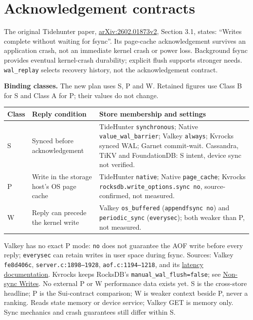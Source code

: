 \section{Acknowledgement contracts}\label{sec:ack}
\begingroup\small
The original Tidehunter paper, \href{https://arxiv.org/abs/2602.01873v2}{arXiv:2602.01873v2},
Section 3.1, states: ``Writes complete without waiting for fsync''.
Its page-cache acknowledgement survives an application crash, not an immediate
kernel crash or power loss. Background fsync provides eventual kernel-crash
durability; explicit flush supports stronger needs. \texttt{wal\_replay}
selects recovery history, not the acknowledgement contract.

\textbf{Binding classes.} The new plan uses S, P and W. Retained figures use
Class B for S and Class A for P; their values do not change.
\begin{center}
\begin{tabular}{L{.08\linewidth}L{.31\linewidth}L{.53\linewidth}}\toprule
Class & Reply condition & Store membership and settings\\\midrule
S & Synced before acknowledgement & TideHunter \texttt{synchronous}; Native \texttt{value\_wal\_barrier}; Valkey \texttt{always}; Kvrocks synced WAL; Garnet commit-wait. Cassandra, TiKV and FoundationDB: S intent, device sync not verified.\\
P & Write in the storage host's OS page cache & TideHunter \texttt{native}; Native \texttt{page\_cache}; Kvrocks \texttt{rocksdb.write\_options.sync no}, source-confirmed, not measured.\\
W & Reply can precede the kernel write & Valkey \texttt{os\_buffered} (\texttt{appendfsync no}) and \texttt{periodic\_sync} (\texttt{everysec}); both weaker than P, not measured.\\\bottomrule
\end{tabular}
\end{center}
Valkey has no exact P mode: \texttt{no} does not guarantee the AOF write before
every reply; \texttt{everysec} can retain writes in user space during fsync.
Sources: Valkey \texttt{fe8d406c}, \texttt{server.c:1898--1928},
\texttt{aof.c:1194--1218}, and its \href{https://valkey.io/topics/latency/}{latency documentation}.
Kvrocks keeps RocksDB's \texttt{manual\_wal\_flush=false}; see
\href{https://github.com/facebook/rocksdb/wiki/Basic-Operations}{Non-sync Writes}.
No external P or W performance data exists yet. S is the cross-store headline;
P is the Sui-contract comparison; W is weaker context beside P, never a ranking.
Reads state memory or device service; Valkey GET is memory only. Sync mechanics
and crash guarantees still differ within S.

